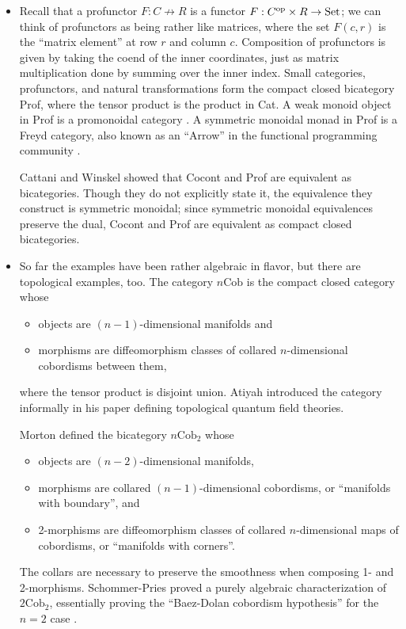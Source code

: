 \documentclass[12pt,twoside,openright]{report}
\newcommand{\Set}{\mathrm{Set}}
\newcommand{\op}{{\rm op}}
\newcommand{\nCob}{n\mbox{Cob}}
\begin{document}
\begin{itemize}
  \item Recall that a profunctor $F:C \not\to R$ is a functor $F:C^{\op} \times R \to \Set$; we can think of profunctors as being rather like matrices, where the set $F(c,r)$ is the ``matrix element'' at row $r$ and column $c$.  Composition of profunctors is given by taking the coend of the inner coordinates, just as matrix multiplication done by summing over the inner index.  Small categories, profunctors, and natural transformations form the compact closed bicategory Prof, where the tensor product is the product in Cat.  A weak monoid object in Prof is a promonoidal category \cite{Day, Houston}. A symmetric monoidal monad in Prof is a Freyd category, also known as an ``Arrow'' in the functional programming community \cite{Asada, JHH}.

    Cattani and Winskel \cite{CW04} showed that Cocont and Prof are equivalent as bicategories.  Though they do not explicitly state it, the equivalence they construct is symmetric monoidal; since symmetric monoidal equivalences preserve the dual, Cocont and Prof are equivalent as compact closed bicategories.
  \item So far the examples have been rather algebraic in flavor, but there are topological examples, too.  The category $\nCob$ is the compact closed category whose
    \begin{itemize}
      \item objects are $(n-1)$-dimensional manifolds and
      \item morphisms are diffeomorphism classes of collared $n$-dimensional cobordisms between them,
    \end{itemize}
    where the tensor product is disjoint union.  Atiyah \cite{AtiyahTQFT} introduced the category informally in his paper defining topological quantum field theories.

    Morton \cite{Morton} defined the bicategory $\nCob_2$ whose
    \begin{itemize}
      \item objects are $(n-2)$-dimensional manifolds,
      \item morphisms are collared $(n-1)$-dimensional cobordisms, or ``manifolds with boundary'', and
      \item 2-morphisms are diffeomorphism classes of collared $n$-dimensional maps of cobordisms, or ``manifolds with corners''.
    \end{itemize}
    The collars are necessary to preserve the smoothness when composing 1- and 2-morphisms.  Schommer-Pries proved a purely algebraic characterization of $2\mbox{Cob}_2$, essentially proving the ``Baez-Dolan cobordism hypothesis'' for the $n=2$ case \cite{HDATQFT}.
    

\end{itemize}
\end{document}

